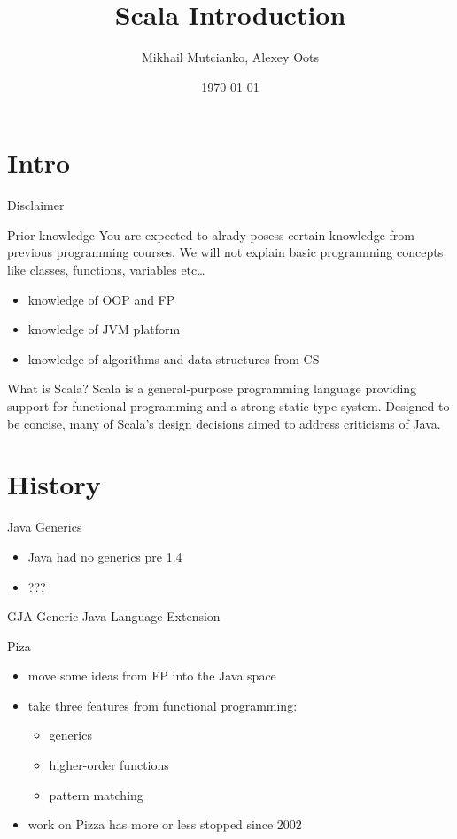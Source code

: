 \documentclass[aspectratio=169]{beamer}
\title{Scala Introduction}
\author{Mikhail Mutcianko, Alexey Oots}
\institute{СПБгУ, кафедра СП}
\date{\today}
\begin{document}
\frame{\titlepage}


\section{Intro}

\begin{frame}{Disclaimer}
  \begin{block}{Prior knowledge}
    You are expected to alrady posess certain knowledge from previous programming courses.
    We will not explain basic programming concepts like classes, functions, variables etc\ldots
  \end{block}
  \pause
  \begin{itemize}
    \item knowledge of OOP and FP
      \pause
    \item knowledge of JVM platform
      \pause
    \item knowledge of algorithms and data structures from CS
  \end{itemize}
\end{frame}

\begin{frame}{What is Scala?}
  Scala is a general-purpose programming language providing support for
  functional programming and a strong static type system. Designed to be concise, many of Scala's
  design decisions aimed to address criticisms of Java.
\end{frame}

\section{History}

\begin{frame}{Java Generics}
  \begin{itemize}
    \item Java had no generics pre 1.4
    \item ???
  \end{itemize}
\end{frame}

\begin{frame}[t]{GJ}{A Generic Java Language Extension}
\end{frame}

\begin{frame}[t]{Piza}
  \begin{itemize}
    \item move some ideas from FP into the Java space
    \item take three features from functional programming:
      \begin{itemize}
        \item generics
        \item higher-order functions
        \item pattern matching
      \end{itemize}
    \item work on Pizza has more or less stopped since 2002
  \end{itemize}
\end{frame}
\end{document}
